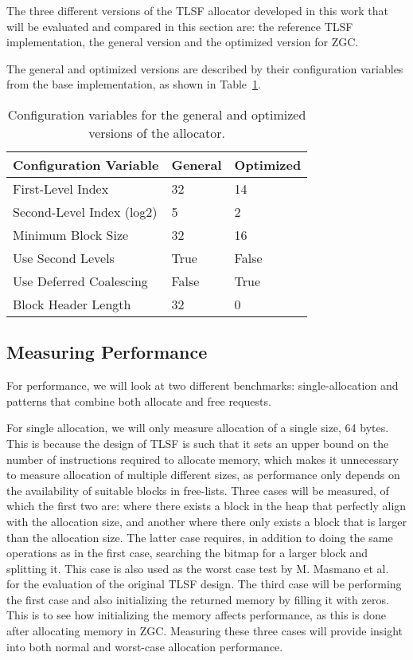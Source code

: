 The three different versions of the TLSF allocator developed in this work that will be evaluated and compared in this section are: the reference TLSF implementation, the general version and the optimized version for ZGC. 

The general and optimized versions are described by their configuration variables from the base implementation, as shown in Table~\ref{table:configuration-variables}.

\begin{table}[H]
\centering
\begin{tabular}{lllll}
\hline
Configuration Variable    & General  & \multicolumn{3}{l}{Optimized} \\ \hline
First-Level Index         & 32       & \multicolumn{3}{l}{14}        \\
Second-Level Index (log2) & 5        & \multicolumn{3}{l}{2}         \\
Minimum Block Size        & 32       & \multicolumn{3}{l}{16 }       \\
Use Second Levels         & True     & \multicolumn{3}{l}{False}     \\
Use Deferred Coalescing   & False    & \multicolumn{3}{l}{True}      \\
Block Header Length       & 32       & \multicolumn{3}{l}{0}        
\end{tabular}
\caption{Configuration variables for the general and optimized versions of the allocator.}
\label{table:configuration-variables}
\end{table}

\subsection{Measuring Performance}

For performance, we will look at two different benchmarks: single-allocation and patterns that combine both allocate and free requests.

For single allocation, we will only measure allocation of a single size, 64 bytes. This is because the design of TLSF is such that it sets an upper bound on the number of instructions required to allocate memory, which makes it unnecessary to measure allocation of multiple different sizes, as performance only depends on the availability of suitable blocks in free-lists. Three cases will be measured, of which the first two are: where there exists a block in the heap that perfectly align with the allocation size, and another where there only exists a block that is larger than the allocation size. The latter case requires, in addition to doing the same operations as in the first case, searching the bitmap for a larger block and splitting it. This case is also used as the worst case test by M. Masmano et al.~\cite{TLSF} for the evaluation of the original TLSF design. The third case will be performing the first case and also initializing the returned memory by filling it with zeros. This is to see how initializing the memory affects performance, as this is done after allocating memory in ZGC. Measuring these three cases will provide insight into both normal and worst-case allocation performance.

